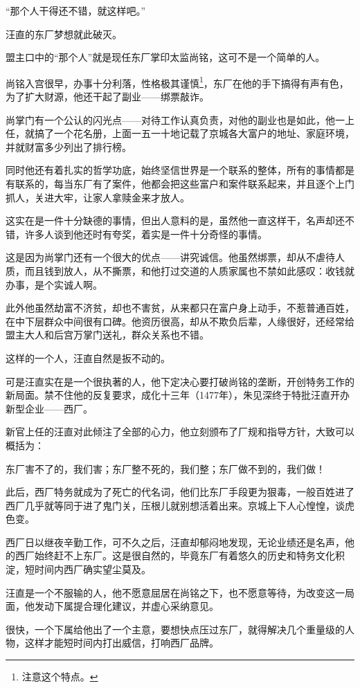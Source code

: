 \begin{multicols}{\theparacolNo}
		“那个人干得还不错，就这样吧。”

		汪直的东厂梦想就此破灭。

		盟主口中的“那个人”就是现任东厂掌印太监尚铭，这可不是一个简单的人。

		尚铭入宫很早，办事十分利落，性格极其谨慎\footnote{注意这个特点。}，东厂在他的手下搞得有声有色，为了扩大财源，他还干起了副业——绑票敲诈。

		尚掌门有一个公认的闪光点——对待工作认真负责，对他的副业也是如此，他一上任，就搞了一个花名册，上面一五一十地记载了京城各大富户的地址、家庭环境，并就财富多少列出了排行榜。

		同时他还有着扎实的哲学功底，始终坚信世界是一个联系的整体，所有的事情都是有联系的，每当东厂有了案件，他都会把这些富户和案件联系起来，并且逐个上门抓人，关进大牢，让家人拿赎金来才放人。

		这实在是一件十分缺德的事情，但出人意料的是，虽然他一直这样干，名声却还不错，许多人谈到他还时有夸奖，着实是一件十分奇怪的事情。

		这是因为尚掌门还有一个很大的优点——讲究诚信。他虽然绑票，却从不虐待人质，而且钱到放人，从不撕票，和他打过交道的人质家属也不禁如此感叹：收钱就办事，是个实诚人啊。

		此外他虽然劫富不济贫，却也不害贫，从来都只在富户身上动手，不惹普通百姓，在中下层群众中间很有口碑。他资历很高，却从不欺负后辈，人缘很好，还经常给盟主大人和后宫万掌门送礼，群众关系也不错。

		这样的一个人，汪直自然是扳不动的。

		可是汪直实在是一个很执著的人，他下定决心要打破尚铭的垄断，开创特务工作的新局面。禁不住他的反复要求，成化十三年（1477年），朱见深终于特批汪直开办新型企业——西厂。

		新官上任的汪直对此倾注了全部的心力，他立刻颁布了厂规和指导方针，大致可以概括为：

		东厂害不了的，我们害；东厂整不死的，我们整；东厂做不到的，我们做！

		此后，西厂特务就成为了死亡的代名词，他们比东厂手段更为狠毒，一般百姓进了西厂几乎就等同于进了鬼门关，压根儿就别想活着出来。京城上下人心惶惶，谈虎色变。

		西厂日以继夜辛勤工作，可不久之后，汪直却郁闷地发现，无论业绩还是名声，他的西厂始终赶不上东厂。这是很自然的，毕竟东厂有着悠久的历史和特务文化积淀，短时间内西厂确实望尘莫及。

		汪直是一个不服输的人，他不愿意屈居在尚铭之下，也不愿意等待，为改变这一局面，他发动下属提合理化建议，并虚心采纳意见。

		很快，一个下属给他出了一个主意，要想快点压过东厂，就得解决几个重量级的人物，这样才能短时间内打出威信，打响西厂品牌。


\end{multicols}
